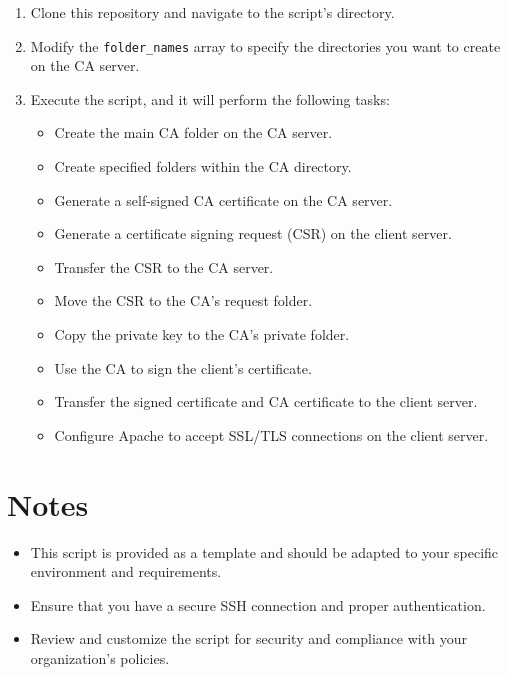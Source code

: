 \documentclass{article}
\begin{document}
\begin{enumerate}
    \item Clone this repository and navigate to the script's directory.
    
    \item Modify the \texttt{folder\_names} array to specify the directories you want to create on the CA server.

    \item Execute the script, and it will perform the following tasks:

    \begin{itemize}
        \item Create the main CA folder on the CA server.
        \item Create specified folders within the CA directory.
        \item Generate a self-signed CA certificate on the CA server.
        \item Generate a certificate signing request (CSR) on the client server.
        \item Transfer the CSR to the CA server.
        \item Move the CSR to the CA's request folder.
        \item Copy the private key to the CA's private folder.
        \item Use the CA to sign the client's certificate.
        \item Transfer the signed certificate and CA certificate to the client server.
        \item Configure Apache to accept SSL/TLS connections on the client server.
    \end{itemize}
\end{enumerate}

\section{Notes}

\begin{itemize}
    \item This script is provided as a template and should be adapted to your specific environment and requirements.
    \item Ensure that you have a secure SSH connection and proper authentication.
    \item Review and customize the script for security and compliance with your organization's policies.
\end{itemize}
\end{document}
